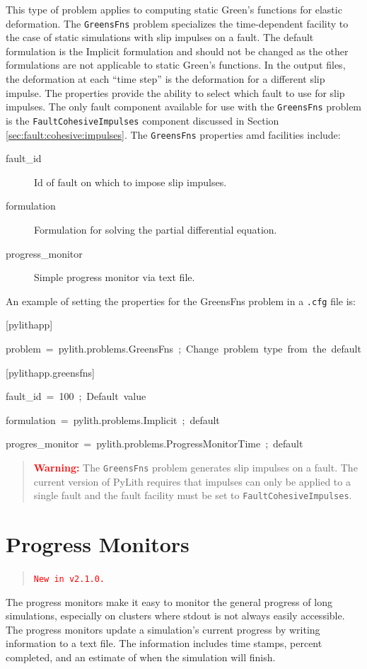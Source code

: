 This type of problem applies to computing static Green's functions
for elastic deformation. The \texttt{GreensFns} problem specializes
the time-dependent facility to the case of static simulations with
slip impulses on a fault. The default formulation is the Implicit
formulation and should not be changed as the other formulations are
not applicable to static Green's functions. In the output files, the
deformation at each ``time step'' is the deformation for a different
slip impulse. The properties provide the ability to select which fault
to use for slip impulses. The only fault component available for use
with the \texttt{GreensFns} problem is the \texttt{FaultCohesiveImpulses}
component discussed in Section \ref{sec:fault:cohesive:impulses}.
The \texttt{GreensFns} properties amd facilities include:
\begin{description}
\item [{fault\_id}] Id of fault on which to impose slip impulses.
\item [{formulation}] Formulation for solving the partial differential
equation.
\item [{progress\_monitor}] Simple progress monitor via text file.
\end{description}
An example of setting the properties for the GreensFns problem in
a \texttt{.cfg} file is:
\begin{lyxcode}
{[}pylithapp{]}

problem~=~pylith.problems.GreensFns~;~Change~problem~type~from~the~default



{[}pylithapp.greensfns{]}

fault\_id~=~100~;~Default~value

formulation~=~pylith.problems.Implicit~;~default

progres\_monitor~=~pylith.problems.ProgressMonitorTime~;~default

\end{lyxcode}
\begin{quote}
\textbf{\textcolor{red}{Warning:}} The \texttt{GreensFns} problem
generates slip impulses on a fault. The current version of PyLith
requires that impulses can only be applied to a single fault and the
fault facility must be set to \texttt{FaultCohesiveImpulses}.
\end{quote}

\section{Progress Monitors}
\begin{quotation}
\texttt{\textcolor{red}{New in v2.1.0.}}
\end{quotation}
The progress monitors make it easy to monitor the general progress
of long simulations, especially on clusters where stdout is not always
easily accessible. The progress monitors update a simulation's current
progress by writing information to a text file. The information includes
time stamps, percent completed, and an estimate of when the simulation
will finish. 


